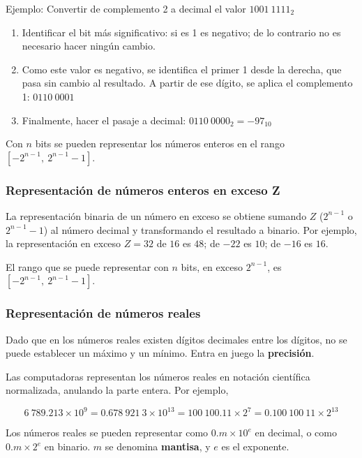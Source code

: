 \documentclass{article}
\begin{document}
Ejemplo: Convertir de complemento 2 a decimal el valor $1001\ 1111_{2}$
\begin{enumerate}
    \item Identificar el bit más significativo: si es 1 es negativo; de lo 
    contrario no es necesario hacer ningún cambio.
    \item Como este valor es negativo, se identifica el primer 1 desde la 
    derecha, que pasa sin cambio al resultado. A partir de ese dígito, se aplica
    el complemento 1: $0110\ 0001$
    \item Finalmente, hacer el pasaje a decimal: $0110\ 0000_{2} = -97_{10}$
\end{enumerate}

Con $n$ bits se pueden representar los números enteros en el rango
$[-2^{n-1},\ 2^{n-1}-1]$.

\subsubsection{Representación de números enteros en exceso Z}

La representación binaria de un número en exceso se obtiene sumando $Z$
($2^{n-1}$ o $2^{n-1}-1$) al número decimal y transformando el resultado a
binario. Por ejemplo, la representación en exceso $Z=32$ de $16$ es $48$; de 
$-22$ es $10$; de $-16$ es $16$.

El rango que se puede representar con $n$ bits, en exceso $2^{n-1}$, es
$[-2^{n-1},\ 2^{n-1}-1]$.

\subsubsection{Representación de números reales}

Dado que en los números reales existen dígitos decimales entre los dígitos, no
se puede establecer un máximo y un mínimo. Entra en juego la \textbf{precisión}.

Las computadoras representan los números reales en notación científica 
normalizada, anulando la parte entera. Por ejemplo, 

\begin{equation*}
    6\ 789.213\times10^9 = 0.678\ 921\ 3\times10^{13} = 
    100\ 100.11\times2^7 = 0.100\ 100\ 11\times2^{13}
\end{equation*}

Los números reales se pueden representar como $0.m\times10^e$ en decimal, o como
$0.m\times2^e$ en binario. $m$ se denomina \textbf{mantisa}, y $e$ es el 
exponente.
\end{document}
